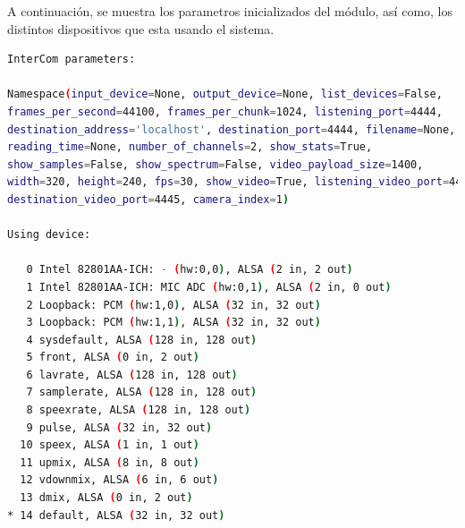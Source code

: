 A continuación, se muestra los parametros inicializados del módulo, así como, los distintos dispositivos que esta usando el sistema.
\begin{lstlisting}[language=bash,basicstyle=\ttfamily\scriptsize]
InterCom parameters:

Namespace(input_device=None, output_device=None, list_devices=False, 
frames_per_second=44100, frames_per_chunk=1024, listening_port=4444, 
destination_address='localhost', destination_port=4444, filename=None, 
reading_time=None, number_of_channels=2, show_stats=True, 
show_samples=False, show_spectrum=False, video_payload_size=1400, 
width=320, height=240, fps=30, show_video=True, listening_video_port=4445, 
destination_video_port=4445, camera_index=1)

Using device:

   0 Intel 82801AA-ICH: - (hw:0,0), ALSA (2 in, 2 out)
   1 Intel 82801AA-ICH: MIC ADC (hw:0,1), ALSA (2 in, 0 out)
   2 Loopback: PCM (hw:1,0), ALSA (32 in, 32 out)
   3 Loopback: PCM (hw:1,1), ALSA (32 in, 32 out)
   4 sysdefault, ALSA (128 in, 128 out)
   5 front, ALSA (0 in, 2 out)
   6 lavrate, ALSA (128 in, 128 out)
   7 samplerate, ALSA (128 in, 128 out)
   8 speexrate, ALSA (128 in, 128 out)
   9 pulse, ALSA (32 in, 32 out)
  10 speex, ALSA (1 in, 1 out)
  11 upmix, ALSA (8 in, 8 out)
  12 vdownmix, ALSA (6 in, 6 out)
  13 dmix, ALSA (0 in, 2 out)
* 14 default, ALSA (32 in, 32 out)
\end{lstlisting}


